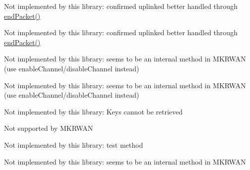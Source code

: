 \begin{DoxyRefList}
%
 Not implemented by this library\+: confirmed uplinked better handled through \mbox{\hyperlink{classSTM32LoRaWAN_a816dd9c8b223bda9380971c5a1dab377}{end\+Packet()}}  
\item[Member \mbox{\hyperlink{classSTM32LoRaWAN_a58632ff20ab6a0f48fa772c827d73cde}{STM32\+Lo\+Ra\+WAN\+::get\+CFS}} ()]\label{extensions__extensions000027}%
%
 Not implemented by this library\+: confirmed uplinked better handled through \mbox{\hyperlink{classSTM32LoRaWAN_a816dd9c8b223bda9380971c5a1dab377}{end\+Packet()}}  
\item[Member \mbox{\hyperlink{classSTM32LoRaWAN_a87dedb0a627b82dcf7bba62edbea3713}{STM32\+Lo\+Ra\+WAN\+::get\+Channel\+Mask}} ()]\label{extensions__extensions000047}%
%
 Not implemented by this library\+: seems to be an internal method in MKRWAN (use enable\+Channel/disable\+Channel instead)  
\item[Member \mbox{\hyperlink{classSTM32LoRaWAN_a067096f42efcee590a3b0c807a65e07f}{STM32\+Lo\+Ra\+WAN\+::get\+Channel\+Mask\+Size}} (\+\_\+lora\+\_\+band band)]\label{extensions__extensions000048}%
%
 Not implemented by this library\+: seems to be an internal method in MKRWAN (use enable\+Channel/disable\+Channel instead)  
\item[Member \mbox{\hyperlink{classSTM32LoRaWAN_a190e38032336a2d69927724fbe872f17}{STM32\+Lo\+Ra\+WAN\+::get\+Nwk\+SKey}} ()]\label{extensions__extensions000042}%
%
 Not implemented by this library\+: Keys cannot be retrieved  
\item[Member \mbox{\hyperlink{classSTM32LoRaWAN_a01ff41259ed00ec882e33eb0e33b72c2}{STM32\+Lo\+Ra\+WAN\+::get\+Port}} ()]\label{extensions__extensions000013}%
%
 Not supported by MKRWAN  
\item[Member \mbox{\hyperlink{classSTM32LoRaWAN_a5c4031e2de24b5f3066603e71e37a2ae}{STM32\+Lo\+Ra\+WAN\+::get\+TConf}} ()]\label{extensions__extensions000031}%
%
 Not implemented by this library\+: test method  
\item[Member \mbox{\hyperlink{classSTM32LoRaWAN_ac49cddab0119f98ae926e53aa11e16f2}{STM32\+Lo\+Ra\+WAN\+::init}} ()]\label{extensions__extensions000040}%
%
 Not implemented by this library\+: seems to be an internal method in MKRWAN  
\item[Member \mbox{\hyperlink{classSTM32LoRaWAN_a272accb2e14a24773c90ffc932861412}{STM32\+Lo\+Ra\+WAN\+::join\+ABP}} ()]\label{extensions__extensions000007}%

\end{DoxyRefList}

